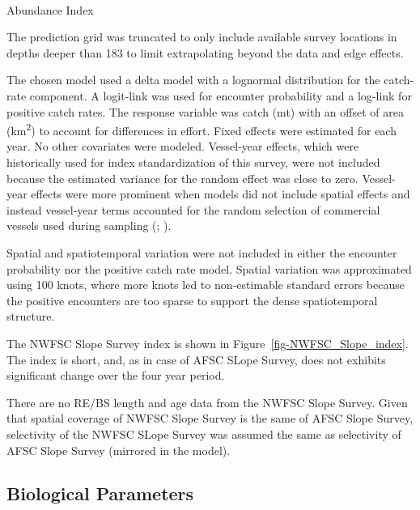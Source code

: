 \documentclass[
]{scrartcl}
\makeatletter
\let\oldparagraph\paragraph
\renewcommand{\paragraph}{
    \@ifstar
      \xxxParagraphStar
      \xxxParagraphNoStar
  }
\newcommand{\xxxParagraphStar}[1]{\oldparagraph*{#1}\mbox{}}
\newcommand{\xxxParagraphNoStar}[1]{\oldparagraph{#1}\mbox{}}
\makeatother
\begin{document}
\paragraph{Abundance Index}\label{abundance-index-3}

The prediction grid was truncated to only include available survey
locations in depths deeper than 183 to limit extrapolating beyond the
data and edge effects.

The chosen model used a delta model with a lognormal distribution for
the catch-rate component. A logit-link was used for encounter
probability and a log-link for positive catch rates. The response
variable was catch (mt) with an offset of area (km\textsuperscript{2})
to account for differences in effort. Fixed effects were estimated for
each year. No other covariates were modeled. Vessel-year effects, which
were historically used for index standardization of this survey, were
not included because the estimated variance for the random effect was
close to zero. Vessel-year effects were more prominent when models did
not include spatial effects and instead vessel-year terms accounted for
the random selection of commercial vessels used during sampling
(;
).

Spatial and spatiotemporal variation were not included in either the
encounter probability nor the positive catch rate model. Spatial
variation was approximated using 100 knots, where more knots led to
non-estimable standard errors because the positive encounters are too
sparse to support the dense spatiotemporal structure.

The NWFSC Slope Survey index is shown in
Figure~\ref{fig-NWFSC_Slope_index}. The index is short, and, as in case
of AFSC SLope Survey, does not exhibits significant change over the four
year period.

There are no RE/BS length and age data from the NWFSC Slope Survey.
Given that spatial coverage of NWFSC Slope Survey is the same of AFSC
Slope Survey, selectivity of the NWFSC SLope Survey was assumed the same
as selectivity of AFSC Slope Survey (mirrored in the model).

\subsection{Biological Parameters}\label{biological-parameters}
\end{document}
